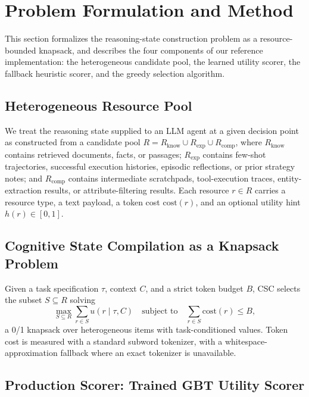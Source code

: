 \documentclass{article}
\begin{document}
\section{Problem Formulation and Method}

This section formalizes the reasoning-state construction problem as a resource-bounded knapsack, and describes the four components of our reference implementation: the heterogeneous candidate pool, the learned utility scorer, the fallback heuristic scorer, and the greedy selection algorithm.

\subsection{Heterogeneous Resource Pool}

We treat the reasoning state supplied to an LLM agent at a given decision point as constructed from a candidate pool $R = R_{\text{know}} \cup R_{\text{exp}} \cup R_{\text{comp}}$, where $R_{\text{know}}$ contains retrieved documents, facts, or passages; $R_{\text{exp}}$ contains few-shot trajectories, successful execution histories, episodic reflections, or prior strategy notes; and $R_{\text{comp}}$ contains intermediate scratchpads, tool-execution traces, entity-extraction results, or attribute-filtering results. Each resource $r \in R$ carries a resource type, a text payload, a token cost $\text{cost}(r)$, and an optional utility hint $h(r) \in [0,1]$.

\subsection{Cognitive State Compilation as a Knapsack Problem}

Given a task specification $\tau$, context $C$, and a strict token budget $B$, CSC selects the subset $S \subseteq R$ solving
\begin{equation}
\max_{S \subseteq R} \sum_{r \in S} u(r \mid \tau, C) \quad \text{subject to} \quad \sum_{r \in S} \text{cost}(r) \leq B,
\end{equation}
a 0/1 knapsack over heterogeneous items with task-conditioned values. Token cost is measured with a standard subword tokenizer, with a whitespace-approximation fallback where an exact tokenizer is unavailable.

\subsection{Production Scorer: Trained GBT Utility Scorer}
\end{document}
